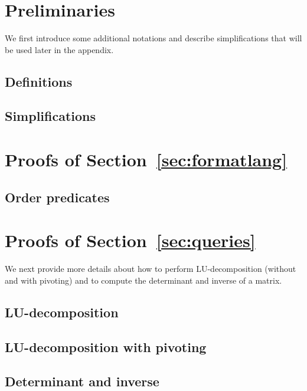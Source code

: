 \section{Preliminaries}
We first introduce some additional notations and describe simplifications that will be used later in the appendix.
\subsection{Definitions}
\label{app:def}

\subsection{Simplifications}\label{app:simp}



\section{Proofs of Section~\ref{sec:formatlang}}

\subsection{Order predicates}\label{app:order}



\section{Proofs of Section~\ref{sec:queries}}
We next provide more details about how to perform LU-decomposition (without and with pivoting)
and to compute the determinant and inverse of a matrix.
\subsection{LU-decomposition}


\subsection{LU-decomposition with pivoting}


\subsection{Determinant and inverse}\label{app:inverse}



